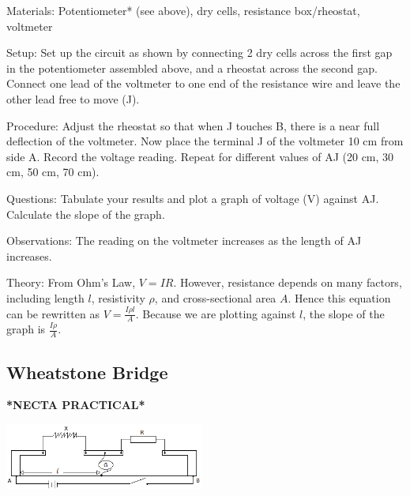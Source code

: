 \begin{multicols}{2}
\begin{description*}
\item[Materials:]{Potentiometer* (see above), dry cells, resistance box/rheostat, voltmeter}
\item[Setup:]{Set up the circuit as shown by connecting 2 dry cells across the first gap in the potentiometer assembled above, and a rheostat across the second gap. Connect one lead of the voltmeter to one end of the resistance wire and leave the other lead free to move (J).}
\item[Procedure:]{Adjust the rheostat so that when J touches B, there is a near full deflection of the voltmeter. Now place the terminal J of the voltmeter 10 cm from side A. Record the voltage reading. Repeat for different values of AJ (20 cm, 30 cm, 50 cm, 70 cm).}
\item[Questions:]{Tabulate your results and plot a graph of voltage (V) against AJ. Calculate the slope of the graph.}
\item[Observations:]{The reading on the voltmeter increases as the length of AJ increases.}
\item[Theory:]{From Ohm's Law, $V = IR$. However, resistance depends on many factors, including length $l$, resistivity $\rho$, and cross-sectional area $A$. Hence this equation can be rewritten as $V = \frac{I \rho l}{A}$. Because we are plotting against $l$, the slope of the graph is $\frac{I \rho}{A}$.}
\end{description*}

\subsection{Wheatstone Bridge}
\textbf{*NECTA PRACTICAL*}

\begin{center}
\includegraphics[width=0.49\textwidth]{./img/metre-bridge-assembly.png}
\end{center}


\end{multicols}
